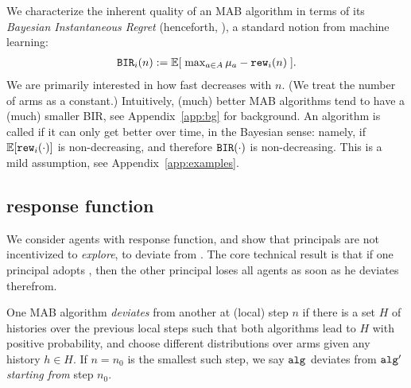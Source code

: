 

We characterize the inherent quality of an MAB algorithm in terms of its \emph{Bayesian Instantaneous Regret} (henceforth, \BIR), a standard notion from machine learning:
\begin{align}\label{eq:theory-BIR-defn}
\BIR_i(n) := \textstyle \E[\; \max_{a\in A} \mu_a - \rew_i(n) \;].
\end{align}
We are primarily interested in how fast \BIR decreases with $n$. (We treat the number of arms as a constant.) Intuitively, (much) better MAB algorithms tend to have a (much) smaller BIR, see Appendix~\ref{app:bg} for background.
An algorithm is called \emph{\bmonotone} if it can only get better over time, in the Bayesian sense: namely, if $\E[\rew_i(\cdot)]$ is non-decreasing, and therefore $\mathtt{BIR}(\cdot)$ is non-decreasing. This is a mild assumption, see
Appendix~\ref{app:examples}.



\subsection{\HardMax response function}
\label{sec:theory-HM}


We consider agents with \HardMax response function, and show that principals are not incentivized to \emph{explore}, \ie to deviate from \DynGreedy. The core technical result is that if one principal adopts \DynGreedy, then the other principal loses all agents as soon as he deviates therefrom. 


\begin{definition}
One MAB algorithm \emph{deviates} from another at (local) step $n$ if there is a set $H$ of histories over the previous local steps such that both algorithms lead to $H$ with positive probability, and choose different distributions over arms given any history $h\in H$. If $n=n_0$ is the smallest such step, we say $\mathtt{alg}_{}$ deviates from $\mathtt{alg}_{}'$ \emph{starting from} step $n_0$.
\end{definition}


